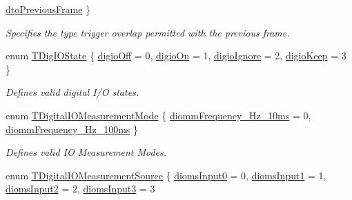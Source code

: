 \begin{DoxyCompactItemize}
\hyperlink{group___device_specific_interface_ggabad99a0fe37e0bf5302ece4fcdd8bbe2a357c39fcdcde68ac67fa0c1ba24e10d4}{dto\+Previous\+Frame}
 \}
\begin{DoxyCompactList}\small\item\em Specifies the type trigger overlap permitted with the previous frame. \end{DoxyCompactList}\item 
enum \hyperlink{group___device_specific_interface_gaa68dd10eeb8003b9f18ac351221a57cc}{T\+Dig\+I\+O\+State} \{ \hyperlink{group___device_specific_interface_ggaa68dd10eeb8003b9f18ac351221a57cca75d9bee34c639dd6b3abfb2d18faa87d}{digio\+Off} = 0, 
\hyperlink{group___device_specific_interface_ggaa68dd10eeb8003b9f18ac351221a57cca10aa076009cb3c4da86a8bc839ede45e}{digio\+On} = 1, 
\hyperlink{group___device_specific_interface_ggaa68dd10eeb8003b9f18ac351221a57ccaeb0f11f1c8be40356a43a784e2af54f6}{digio\+Ignore} = 2, 
\hyperlink{group___device_specific_interface_ggaa68dd10eeb8003b9f18ac351221a57cca4353b6ca48998eaa486f7667dad29e75}{digio\+Keep} = 3
 \}
\begin{DoxyCompactList}\small\item\em Defines valid digital I/\+O states. \end{DoxyCompactList}\item 
enum \hyperlink{group___device_specific_interface_ga85a0b4826a79540c0542e50616f287ad}{T\+Digital\+I\+O\+Measurement\+Mode} \{ \hyperlink{group___device_specific_interface_gga85a0b4826a79540c0542e50616f287adaa5f19038a3806042ac9441b1e7d02ac1}{diomm\+Frequency\+\_\+\+Hz\+\_\+10ms} = 0, 
\hyperlink{group___device_specific_interface_gga85a0b4826a79540c0542e50616f287ada6e1a150ec12f9bbaff3dc94a724a8ded}{diomm\+Frequency\+\_\+\+Hz\+\_\+100ms}
 \}
\begin{DoxyCompactList}\small\item\em Defines valid I\+O Measurement Modes. \end{DoxyCompactList}\item 
enum \hyperlink{group___device_specific_interface_gadcaf6d1f6549e591bf57e04cd7892b6a}{T\+Digital\+I\+O\+Measurement\+Source} \{ \hyperlink{group___device_specific_interface_ggadcaf6d1f6549e591bf57e04cd7892b6aa87b19cd36300f8ed0057981e3c128710}{dioms\+Input0} = 0, 
\hyperlink{group___device_specific_interface_ggadcaf6d1f6549e591bf57e04cd7892b6aa8c86f34d77e275cc3f7649c1bf4f49fa}{dioms\+Input1} = 1, 
\hyperlink{group___device_specific_interface_ggadcaf6d1f6549e591bf57e04cd7892b6aa97491ed298784a1cdbac34975233223d}{dioms\+Input2} = 2, 
\hyperlink{group___device_specific_interface_ggadcaf6d1f6549e591bf57e04cd7892b6aa771c3458e186c164a460cd767b205aab}{dioms\+Input3} = 3

\end{DoxyCompactItemize}
